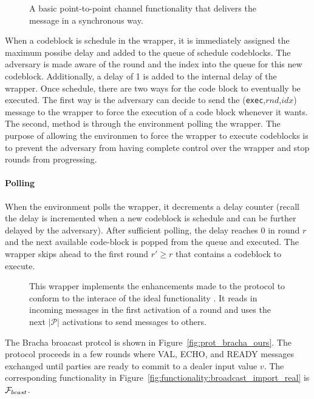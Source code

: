 \begin{figure}
	
	\caption{A basic point-to-point channel functionality that delivers the message in a synchronous way.}
	\label{fig:functionality:channel}
\end{figure}

When a codeblock is schedule in the wrapper, it is immediately assigned the maximum possibe delay and added to the queue of schedule codeblocks.
The adversary is made aware of the round and the index into the queue for this new codeblock.
Additionally, a delay of 1 is added to the internal delay of the wrapper.
Once schedule, there are two ways for the code block to eventually be executed.
The first way is the adversary can decide to send the (\texttt{exec},$rnd$,$idx$) message to the wrapper to force the execution of a code block whenever it wants.
The second, method is through the environment polling the wrapper.
The purpose of allowing the environmen to force the wrapper to execute codeblocks is to prevent the adversary from having complete control over the wrapper and stop rounds from progressing.

\paragraph{Polling}
When the environment polls the wrapper, it decrements a delay counter (recall the delay is incremented when a new codeblock is schedule and can be further delayed by the adversary).
After sufficient polling, the delay reaches 0 in round $r$ and the next available code-block is popped from the queue and executed. 
The wrapper skips ahead to the first round $r' \geq r$ that contains a codeblock to execute.

\begin{figure}
	
	\caption{This wrapper implements the enhancements made to the protocol to conform to the interace of the ideal functionality \Fbc. It reads in incoming messages in the first activation of a round and uses the next $|\mathcal{P}|$ activations to send messages to others.}
	\label{fig:wrapper:synchronous}
\end{figure}

The Bracha broacast protcol is shown in Figure~\ref{fig:prot_bracha_ours}. 
The protocol proceeds in a few rounds where VAL, ECHO, and READY messages exchanged until parties are ready to commit to a dealer input value $v$.
The corresponding functionality in Figure~\ref{fig:functionality:broadcast_import_real} is $\mathcal{F}_{bcast}$.

